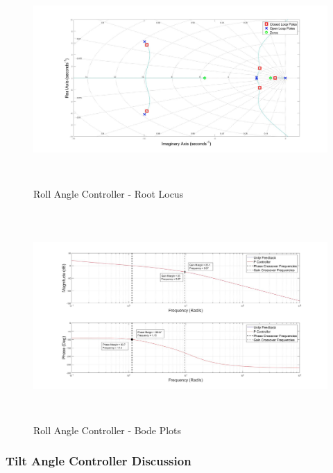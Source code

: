 		\begin{figure}[H]
			\centering
			\includegraphics[height = 8cm]{../Design/Matlab/Controllers/roll_angle_root.jpg}
			\caption{Roll Angle Controller -  Root Locus}
			\label{IM_RollAngleControlRoot}
		\end{figure}
		
		\begin{figure}[H]
			\centering
			\includegraphics[height = 8cm]{../Design/Matlab/Controllers/roll_angle_bode.jpg}
			\caption{Roll Angle Controller -  Bode Plots}
			\label{IM_RollAngleControlBode}
		\end{figure}
	
		\subsubsection{Tilt Angle Controller Discussion}
		
